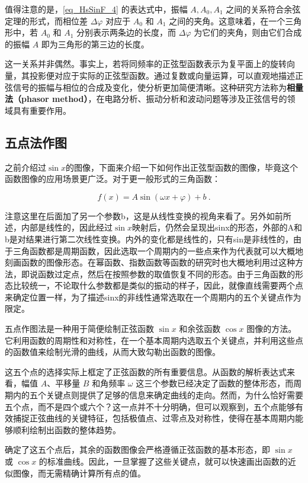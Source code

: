 值得注意的是，\autoref{eq_HsSinF_4} 的表达式中，振幅 $A, A_0, A_1$ 之间的关系符合余弦定理的形式，而相位差 $\Delta \varphi$ 对应于 $A_0$ 和 $A_1$ 之间的夹角。这意味着，在一个三角形中，若 $A_0$ 和 $A_1$ 分别表示两条边的长度，而 $\Delta \varphi$ 为它们的夹角，则由它们合成的振幅 $A$ 即为三角形的第三边的长度。

这一关系并非偶然。事实上，若将同频率的正弦型函数表示为复平面上的旋转向量，其投影便对应于实际的正弦型函数。通过复数或向量运算，可以直观地描述正弦信号的振幅与相位的合成及变化，使分析更加简便清晰。这种研究方法称为\textbf{相量法（phasor method）}，在电路分析、振动分析和波动问题等涉及正弦信号的领域具有重要作用。

\subsection{五点法作图}

之前介绍过$\sin x$的图像，下面来介绍一下如何作出正弦型函数的图像，毕竟这个函数图像的应用场景更广泛。对于更一般形式的三角函数：

\begin{equation}
f(x) = A \sin(\omega x + \varphi) + b~.
\end{equation}

注意这里在后面加了另一个参数b，这是从线性变换的视角来看了。另外如前所述，内部是线性的，因此经过$\sin x$映射后，仍然会呈现出sinx的形态，外部的A和b是对结果进行第二次线性变换。内外的变化都是线性的，只有sin是非线性的，由于三角函数都是周期函数，因此选取一个周期内的一些点来作为代表就可以大概地刻画函数的图像形态。在幂函数、指数函数等函数的研究时也大概地利用过这种方法，即说函数过定点，然后在按照参数的取值恢复不同的形态。由于三角函数的形态比较统一，不论取什么参数都是类似的振动的样子，因此，就像直线需要两个点来确定位置一样，为了描述sinx的非线性通常选取在一个周期内的五个关键点作为限定。


五点作图法是一种用于简便绘制正弦函数 $\sin x$ 和余弦函数 $\cos x$ 图像的方法。它利用函数的周期性和对称性，在一个基本周期内选取五个关键点，并利用这些点的函数值来绘制光滑的曲线，从而大致勾勒出函数的图像。


这五个点的选择实际上框定了正弦函数的所有重要信息。从函数的解析表达式来看，幅值 $A$、平移量 $B$ 和角频率 $\omega$ 这三个参数已经决定了函数的整体形态，而周期内的五个关键点则提供了足够的信息来确定曲线的走向。然而，为什么恰好需要五个点，而不是四个或六个？这一点并不十分明确，但可以观察到，五个点能够有效捕捉正弦曲线的关键特征，包括极值点、过零点及对称性，使得在基本周期内能够顺利绘制出函数的整体趋势。

确定了这五个点后，其余的函数图像会严格遵循正弦函数的基本形态，即 $\sin x$ 或 $\cos x$ 的标准曲线。因此，一旦掌握了这些关键点，就可以快速画出函数的近似图像，而无需精确计算所有点的值。




